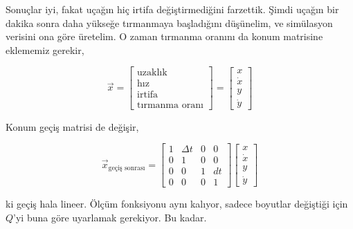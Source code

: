 \documentclass[12pt,fleqn]{article}\usepackage{../../common}
\begin{document}
Sonuçlar iyi, fakat uçağın hiç irtifa değiştirmediğini farzettik. Şimdi
uçağın bir dakika sonra daha yükseğe tırmanmaya başladığını düşünelim, ve
simülasyon verisini ona göre üretelim. O zaman tırmanma oranını da konum
matrisine eklememiz gerekir, 

$$ \vec{x} = 
\left[\begin{array}{c}  
\textrm{uzaklık} \\ \textrm{hız} \\ \textrm{irtifa} \\ \textrm{tırmanma oranı}
\end{array}\right] = 
\left[\begin{array}{c}  
x \\ \dot{x} \\ y \\ \dot{y}
\end{array}\right]
$$

Konum geçiş matrisi de değişir, 

$$ \vec{x}_{\textrm{geçiş sonrası}} = 
\left[\begin{array}{cccc}
1 & \Delta t & 0 & 0 \\ 
0 & 1 & 0 & 0 \\ 
0 & 0 & 1 & dt \\
0 & 0 & 0 & 1
\end{array}\right]
\left[\begin{array}{c}  x \\ \dot{x} \\ y \\ \dot{y} \end{array}\right]
$$

ki geçiş hala lineer. Ölçüm fonksiyonu aynı kalıyor, sadece boyutlar
değiştiği için $Q$'yi buna göre uyarlamak gerekiyor. Bu kadar. 
\end{document}
